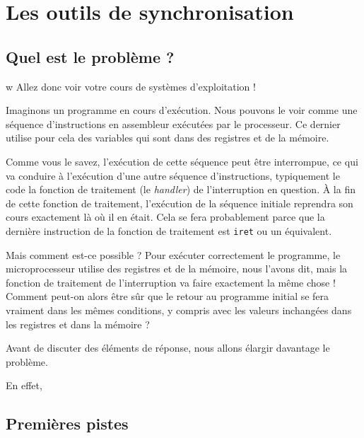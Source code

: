%
\section{Les outils de synchronisation}

%
\subsection{Quel est le problème ?}
w
   Allez donc voir votre cours de systèmes d'exploitation !

   Imaginons un programme en cours d'exécution. Nous pouvons le voir
comme une séquence d'instructions en assembleur exécutées par le
processeur. Ce dernier utilise pour cela des variables qui sont dans
des registres et de la mémoire.

   Comme vous le savez, l'exécution de cette séquence peut être
interrompue, ce qui va conduire à l'exécution d'une autre séquence
d'instructions, typiquement le code la fonction de traitement (le {\em
  handler}) de l'interruption en question. À la fin de cette fonction
de traitement, l'exécution de la séquence initiale reprendra son
cours exactement là où il en était. Cela se fera probablement parce
que la dernière instruction de la fonction de traitement est
\lstinline!iret! ou un équivalent.

   Mais comment est-ce possible ? Pour exécuter correctement le
programme, le microprocesseur utilise des registres et de la mémoire,
nous l'avons dit, mais la fonction de traitement de l'interruption va
faire exactement la même chose ! Comment peut-on alors être sûr que le
retour au programme initial se fera vraiment dans les mêmes
conditions, y compris avec les valeurs inchangées dans les registres
et dans la mémoire ?

   Avant de discuter des éléments de réponse, nous allons élargir
davantage le problème.

   En effet, 

%
\subsection{Premières pistes}


